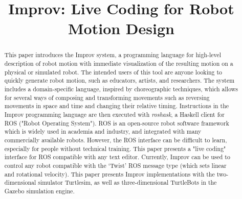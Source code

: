 \documentclass[sigconf]{acmart}
\begin{document}
\title{Improv: Live Coding for Robot Motion Design}


%
%
%


\begin{abstract}
This paper introduces the Improv system, a programming language for high-level
description of robot motion with immediate visualization of the
resulting motion on a physical or simulated robot. The intended users of this
tool are anyone looking to quickly generate robot motion, such as educators,
artists, and researchers. The system includes a domain-specific language,
inspired by choreographic techniques, which allows for several ways of composing
and transforming movements such as reversing movements in space and time and
changing their relative timing. Instructions in the Improv programming language
are then executed with \emph{roshask}, a Haskell client for ROS ("Robot Operating
System"). ROS is an open-source robot software framework which is widely used in
academia and industry, and integrated with many commercially available robots.
However, the ROS interface can be difficult to learn, especially for people
without technical training. This paper presents a "live coding" interface for
ROS compatible with any text editor. Currently, Improv can be used to control any robot compatible with the
`Twist' ROS message type (which sets linear and rotational velocity). This paper
presents Improv implementations with the two-dimensional simulator
Turtlesim, as well as three-dimensional TurtleBots in the Gazebo simulation
engine.
\end{abstract}
\end{document}
